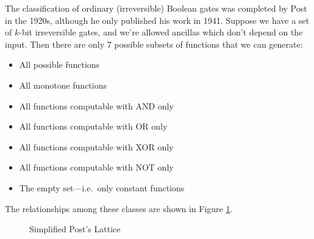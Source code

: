 \documentclass[11pt]{report}
\theoremstyle{plain}
\theoremstyle{definition}
\begin{document}
The classification of ordinary (irreversible) Boolean gates was completed by Post \cite{PostsLattice} in the 1920s, although he only published his work in 1941. Suppose we have a set of $k$-bit irreversible gates, and we're allowed ancillas which don't depend on the input. Then there are only 7 possible subsets of functions that we can generate:
\begin{itemize}
\item All possible functions
\item All monotone functions
\item All functions computable with AND only
\item All functions computable with OR only
\item All functions computable with XOR only
\item All functions computable with NOT only
\item The empty set---i.e.\ only constant functions
\end{itemize}
The relationships among these classes are shown in Figure \ref{post}.
\begin{figure}[h]
\begin{center}
\end{center}
\caption{Simplified Post's Lattice}
\label{post}
\end{figure}
\end{document}
